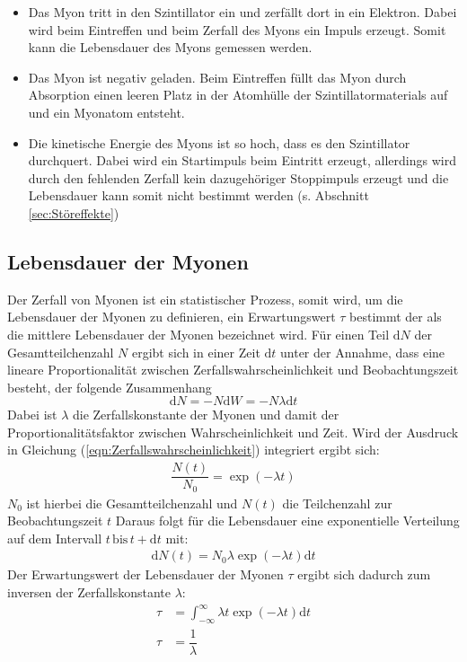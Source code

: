 \begin{itemize}
  \item Das Myon tritt in den Szintillator ein und zerfällt dort in ein Elektron. Dabei wird beim Eintreffen und beim Zerfall des Myons ein Impuls erzeugt. Somit kann die Lebensdauer des Myons gemessen werden.
  \item Das Myon ist negativ geladen. Beim Eintreffen füllt das Myon durch Absorption einen leeren Platz in der Atomhülle der Szintillatormaterials auf und ein Myonatom entsteht.
  \item Die kinetische Energie des Myons ist so hoch, dass es den Szintillator durchquert. Dabei wird ein Startimpuls beim Eintritt erzeugt, allerdings wird durch den fehlenden Zerfall kein dazugehöriger Stoppimpuls
  erzeugt und die Lebensdauer kann somit nicht bestimmt werden (s. Abschnitt \ref{sec:Störeffekte})
\end{itemize}
\subsection{Lebensdauer der Myonen}
Der Zerfall von Myonen ist ein statistischer Prozess, somit wird, um die Lebensdauer der Myonen zu definieren, ein Erwartungswert $\tau$ bestimmt der als die mittlere Lebensdauer der Myonen bezeichnet wird.
Für einen Teil $\mathrm{d}N$ der Gesamtteilchenzahl $N$ ergibt sich in einer Zeit $\mathrm{d}t$ unter der Annahme, dass eine lineare Proportionalität zwischen Zerfallswahrscheinlichkeit und Beobachtungszeit besteht, der folgende Zusammenhang
\begin{equation}
  \label{eqn:Zerfallswahrscheinlichkeit}
  \mathrm{d}N = -N\mathrm{d}W = -N \lambda \mathrm{d}t
\end{equation}
Dabei ist $\lambda$ die Zerfallskonstante der Myonen und damit der Proportionalitätsfaktor zwischen Wahrscheinlichkeit und Zeit. Wird der Ausdruck in Gleichung (\ref{eqn:Zerfallswahrscheinlichkeit}) integriert ergibt sich:
\begin{align}
  \label{eqn:Integriertes Zerfallsgesetz}
\dfrac{N(t)}{N_\mathrm{0}} = \exp(-\lambda t)
\end{align}
$N_\mathrm{0}$ ist hierbei die Gesamtteilchenzahl und $N(t)$ die Teilchenzahl zur Beobachtungszeit $t$
Daraus folgt für die Lebensdauer eine exponentielle Verteilung auf dem Intervall $t \, \mathrm{bis} \, t+\mathrm{d}t$ mit:
\begin{align}
  \label{eqn:Lebensdauer exponentiell}
  \mathrm{d}N(t) = N_\mathrm{0} \lambda \exp(-\lambda t) \mathrm{d}t
\end{align}
Der Erwartungswert der Lebensdauer der Myonen $\tau$ ergibt sich dadurch zum inversen der Zerfallskonstante $\lambda$:
\begin{align}
  \label{eqn:erw}
  \tau &= \int_{-\infty}^{\infty} \lambda t \exp(-\lambda t) \mathrm{d}t \\
  \label{eqn:Erwa}
  \tau &= \dfrac{1}{\lambda}
\end{align}
